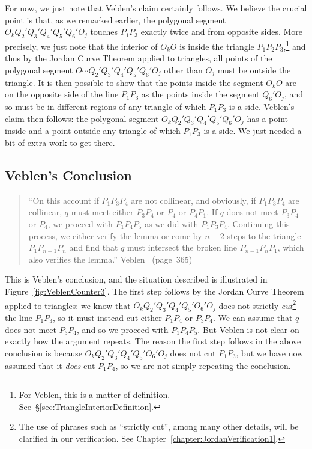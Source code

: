 For now, we just note that Veblen's claim certainly follows. We believe the crucial point is that, as we remarked earlier, the polygonal segment $O_kQ_2'Q_3'Q_4'Q_5'Q_6'O_j$ touches $P_1P_3$ exactly twice and from opposite sides. More precisely, we just note that the interior of $O_kO$ is inside the triangle $P_1P_2P_3$,\footnote{For Veblen, this is a matter of definition. See~\S\ref{sec:TriangleInteriorDefinition}.} and thus by the Jordan Curve Theorem applied to triangles, all points of the polygonal segment $O\cdots Q_2'Q_3'Q_4'Q_5'Q_6'O_j$ other than $O_j$ must be outside the triangle. It is then possible to show that the points inside the segment $O_kO$ are on the opposite side of the line $P_1P_3$ as the points inside the segment $Q_6'O_j$, and so must be in different regions of any triangle of which $P_1P_3$ is a side. Veblen's claim then follows: the polygonal segment $O_kQ_2'Q_3'Q_4'Q_5'Q_6'O_j$ has a point inside and a point outside any triangle of which $P_1P_3$ is a side. We just needed a bit of extra work to get there.

\subsection{Veblen's Conclusion}
\begin{quote}
``On this account if $P_1P_3P_4$ are not collinear, and obviously, if $P_1P_3P_4$ are collinear, $q$ must meet either $P_3P_4$ or $P_4$ or $P_4P_1$. If $q$ does not meet $P_3P_4$ or $P_4$, we proceed with $P_1P_4P_5$ as we did with $P_1P_3P_4$. Continuing this process, we either verify the lemma or come by $n-2$ steps to the triangle $P_1P_{n-1}P_n$ and find that $q$ must intersect the broken line $P_{n-1}P_nP_1$, which also verifies the lemma.'' Veblen~\cite{Veblenphd} (page~365)
\end{quote}

This is Veblen's conclusion, and the situation described is illustrated in Figure~\ref{fig:VeblenCounter3}. The first step follows by the Jordan Curve Theorem applied to triangles: we know that $O_kQ_2'Q_3'Q_4'Q_5'O_6'O_j$ does not strictly \emph{cut}\footnote{The use of phrases such as ``strictly cut'', among many other details, will be clarified in our verification. See Chapter~\ref{chapter:JordanVerification1}.} the line $P_1P_3$, so it must instead cut either $P_1P_4$ or $P_3P_4$. We can assume that $q$ does not meet $P_3P_4$, and so we proceed with $P_1P_4P_5$. But Veblen is not clear on exactly how the argument repeats. The reason the first step follows in the above conclusion is because $O_kQ_2'Q_3'Q_4'Q_5'O_6'O_j$ does not cut $P_1P_3$, but we have now assumed that it \emph{does} cut $P_1P_4$, so we are not simply repeating the conclusion. 

